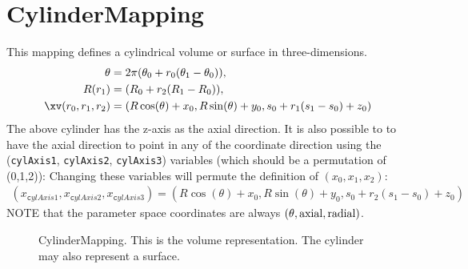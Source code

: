 \section{CylinderMapping}

This mapping defines a cylindrical volume or surface in three-dimensions.
\begin{align}
 \theta &=  2\pi( \theta_0 + r_0( \theta_1-\theta_0) ) ,\\
 R(r_1) &= (R_0 + r_2 (R_1-R_0))  , \\
 \xv(r_0,r_1,r_2) &= ( R \cos(\theta ) + x_0 , R\sin(\theta) + y_0 , s_0 + r_1(s_1-s_0) + z_0 ) 
\end{align}
The above cylinder has the z-axis as the axial direction. It is also possible to to have the
axial direction to point in any of the coordinate direction using the 
({\tt cylAxis1}, {\tt cylAxis2}, {\tt cylAxis3}) variables (which should be a permutation of (0,1,2)):
Changing these variables will permute the definition of $(x_0,x_1,x_2)$: 
\begin{align}
    (x_{\mathtt cylAxis1},x_{\mathtt cylAxis2},x_{\mathtt cylAxis3}) = ( R \cos(\theta ) 
             + x_0 , R\sin(\theta) + y_0 , s_0 + r_2(s_1-s_0) + z_0 )
\end{align}
NOTE that the parameter space coordinates are always $(\theta,\rm{axial},\rm{radial})$. 

\begin{figure}[hbt]
\newcommand{\figWidth}{10cm}
\newcommand{\trimfig}[2]{\trimFig{#1}{#2}{0.05}{.025}{.05}{.05}}
\begin{center}\small
 \caption{CylinderMapping. This is the volume representation. The cylinder may also represent a surface. }
\label{fig:CylinderMapping}
\end{center}
\end{figure}


